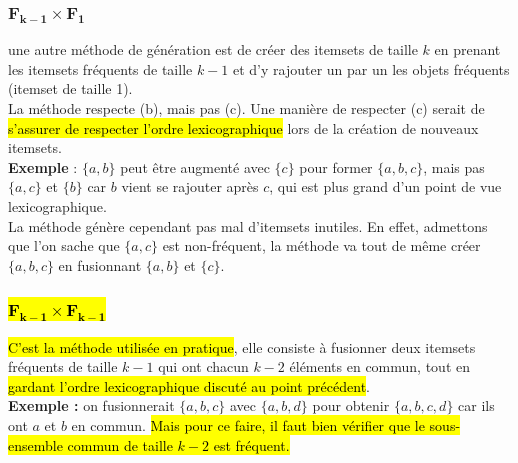 \documentclass[letterpaper, 12pt]{article}
\newcommand{\alinea}{
\hspace*{0.5cm}}
\begin{document}
			\subsubsection{$\mathbf{F_{k-1} \times F_1}$}
				\alinea une autre méthode de génération est de 
					créer des itemsets de taille $k$ en prenant 
					les itemsets fréquents de taille $k-1$ et d'y rajouter 
					un par un les objets fréquents (itemset de taille 1).\\
				\alinea La méthode respecte (b), mais pas (c). Une manière de 
					respecter (c) serait de \hl{s'assurer de respecter l'ordre
					lexicographique} lors de la création de nouveaux 
					itemsets. \\
				\textbf{Exemple} : $\{a, b\}$ peut être 
					augmenté
					avec $\{c\}$ pour former  $\{a,b,c\}$, mais pas 
					$\{a, c\}$ et $\{b\}$ car $b$ vient se rajouter
					après $c$, qui est plus grand d'un point de vue
					lexicographique.\\
				\alinea La méthode génère cependant pas mal d'itemsets
					inutiles. En effet, admettons que l'on sache que 
					$\{a,c\}$ est non-fréquent, la méthode va tout
					de même créer $\{a,b,c\}$ en fusionnant $\{a,b\}$
					et $\{c\}$.
			\newpage
			\subsubsection{\hl{$\mathbf{F_{k-1} \times F_{k-1}}$}}
				\alinea \hl{C'est la méthode utilisée en pratique}, 
					elle consiste à fusionner deux itemsets fréquents de taille
					$k-1$ qui ont chacun $k-2$ éléments en commun, tout
					en \hl{gardant l'ordre lexicographique discuté au point
					précédent}.\\
				\textbf{Exemple :} on fusionnerait $\{a,b,c\}$ avec
					$\{a,b,d\}$ pour obtenir $\{a,b,c,d\}$ car ils ont $a$ et
					$b$ en commun. \hl{Mais pour ce faire, il faut bien
					vérifier que le sous-ensemble commun de taille $k-2$ 
					est fréquent.}
\end{document}
